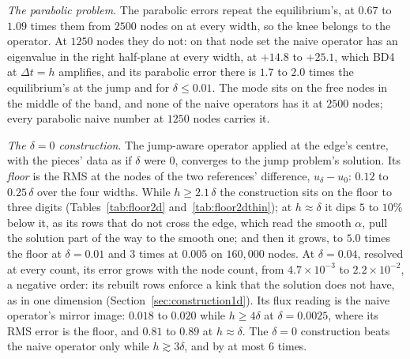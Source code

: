 \documentclass[11pt]{amsart}
\theoremstyle{definition}
\theoremstyle{remark}
\newcommand{\para}[1]{\par\smallskip\noindent\textit{#1}.\enspace}
\newcommand{\sci}[2]{#1 \times 10^{#2}}
\begin{document}
\para{The parabolic problem}
The parabolic errors repeat the equilibrium's, at $0.67$ to $1.09$ times
them from $2500$ nodes on at every width, so the knee belongs to the
operator. At $1250$ nodes they do not: on that node set the naive operator
has an eigenvalue in the right half-plane at every width, at $+14.8$ to
$+25.1$, which BD4 at $\Delta t = h$ amplifies, and its parabolic error there
is $1.7$ to $2.0$ times the equilibrium's at the jump and for
$\delta \le 0.01$. The mode sits on the free nodes in the middle of the band,
and none of the naive operators has it at $2500$ nodes; every parabolic
naive number at $1250$ nodes carries it.

\para{The $\delta = 0$ construction}
The jump-aware operator applied at the edge's centre, with the pieces' data as
if $\delta$ were $0$, converges to the jump problem's solution. Its
\emph{floor} is the RMS at the nodes of the two references' difference,
$u_\delta - u_0$: $0.12$ to $0.25\,\delta$ over the four widths. While
$h \ge 2.1\,\delta$ the construction sits on the floor to three digits
(Tables~\ref{tab:floor2d} and~\ref{tab:floor2dthin}); at $h \approx \delta$ it dips $5$ to $10\%$ below
it, as its rows that do not cross the edge, which read the smooth $\alpha$,
pull the solution part of the way to the smooth one; and then it grows, to
$5.0$ times the floor at $\delta = 0.01$ and $3$ times at $0.005$ on
$160{,}000$ nodes. At $\delta = 0.04$, resolved at every count, its error
grows with the node count, from $\sci{4.7}{-3}$ to $\sci{2.2}{-2}$, a negative
order: its rebuilt rows enforce a kink that the solution does not have, as in
one dimension (Section~\ref{sec:construction1d}). Its flux reading is the
naive operator's mirror image: $0.018$ to $0.020$ while $h \ge 4\delta$ at
$\delta = 0.0025$, where its RMS error is the floor, and $0.81$ to $0.89$ at
$h \approx \delta$. The $\delta = 0$ construction beats the naive operator only while
$h \gtrsim 3\delta$, and by at most $6$ times.
\end{document}
